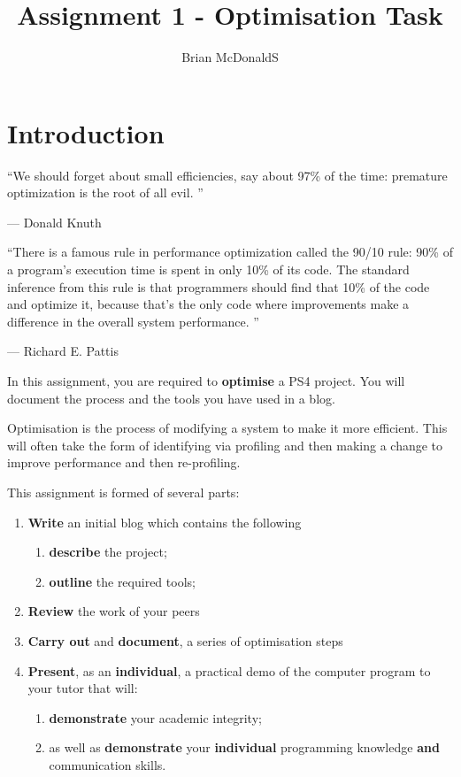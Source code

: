\documentclass{../../fal_assignment}
\title{Assignment 1 - Optimisation Task}
\author{Brian McDonaldS}
\begin{document}
\maketitle

%

\section*{Introduction}

\begin{marginquote}
``We should forget about small efficiencies, say about 97\% of the time: premature optimization is the root of all evil. ''

--- Donald Knuth

    \marginquoterule

``There is a famous rule in performance optimization called the 90/10 rule: 90\% of a program's execution time is spent in only 10\% of its code. The standard inference from this rule is that programmers should find that 10\% of the code and optimize it, because that's the only code where improvements make a difference in the overall system performance. ''

--- Richard E. Pattis
\end{marginquote}


In this assignment, you are required to \textbf{optimise} a PS4 project. You will document the process and the tools you have used in a blog.

Optimisation is the process of modifying a system to make it more efficient. This will often take the form of identifying via profiling and then making a change to improve performance and then re-profiling. 

This assignment is formed of several parts:
\begin{enumerate}[label=(\Alph*)]
	\item \textbf{Write} an initial blog which contains the following
		\begin{enumerate}[label=(\roman*)]
			\item \textbf{describe} the project;
			\item \textbf{outline} the required tools;
		\end{enumerate}
	\item \textbf{Review} the work of your peers
	\item \textbf{Carry out} and \textbf{document}, a series of optimisation steps
	\item \textbf{Present}, as an \textbf{individual}, a practical demo of the computer program to your tutor that will:
	\begin{enumerate}[label=\roman*.]
		\item \textbf{demonstrate} your academic integrity;
		\item as well as \textbf{demonstrate} your \textbf{individual} programming knowledge \textbf{and} communication skills.
	\end{enumerate}
\end{enumerate}
\end{document}
